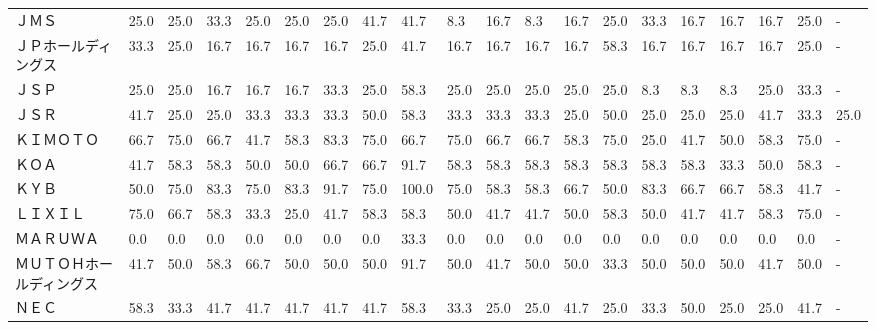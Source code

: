 \documentclass[a4paper，11pt]{jsarticle}
\begin{document}
\begin{longtable}[c]{lp{3mm}p{3mm}p{3mm}p{3mm}p{3mm}p{3mm}p{3mm}p{3mm}p{3mm}p{3mm}p{3mm}p{3mm}p{3mm}p{3mm}p{3mm}p{3mm}p{3mm}p{3mm}p{3mm}}
ＪＭＳ             &   25.0 &   25.0 &      33.3 &      25.0 &       25.0 &   25.0 &   41.7 &   41.7 &     8.3 &    16.7 &    8.3 &  16.7 &   25.0 &    33.3 &    16.7 &  16.7 &  16.7 &  25.0 &     - \\
ＪＰホールディングス      &   33.3 &   25.0 &      16.7 &      16.7 &       16.7 &   16.7 &   25.0 &   41.7 &    16.7 &    16.7 &   16.7 &  16.7 &   58.3 &    16.7 &    16.7 &  16.7 &  16.7 &  25.0 &     - \\
ＪＳＰ             &   25.0 &   25.0 &      16.7 &      16.7 &       16.7 &   33.3 &   25.0 &   58.3 &    25.0 &    25.0 &   25.0 &  25.0 &   25.0 &     8.3 &     8.3 &   8.3 &  25.0 &  33.3 &     - \\
ＪＳＲ             &   41.7 &   25.0 &      25.0 &      33.3 &       33.3 &   33.3 &   50.0 &   58.3 &    33.3 &    33.3 &   33.3 &  25.0 &   50.0 &    25.0 &    25.0 &  25.0 &  41.7 &  33.3 &  25.0 \\
ＫＩＭＯＴＯ          &   66.7 &   75.0 &      66.7 &      41.7 &       58.3 &   83.3 &   75.0 &   66.7 &    75.0 &    66.7 &   66.7 &  58.3 &   75.0 &    25.0 &    41.7 &  50.0 &  58.3 &  75.0 &     - \\
ＫＯＡ             &   41.7 &   58.3 &      58.3 &      50.0 &       50.0 &   66.7 &   66.7 &   91.7 &    58.3 &    58.3 &   58.3 &  58.3 &   58.3 &    58.3 &    58.3 &  33.3 &  50.0 &  58.3 &     - \\
ＫＹＢ             &   50.0 &   75.0 &      83.3 &      75.0 &       83.3 &   91.7 &   75.0 &  100.0 &    75.0 &    58.3 &   58.3 &  66.7 &   50.0 &    83.3 &    66.7 &  66.7 &  58.3 &  41.7 &     - \\
ＬＩＸＩＬ           &   75.0 &   66.7 &      58.3 &      33.3 &       25.0 &   41.7 &   58.3 &   58.3 &    50.0 &    41.7 &   41.7 &  50.0 &   58.3 &    50.0 &    41.7 &  41.7 &  58.3 &  75.0 &     - \\
ＭＡＲＵＷＡ          &    0.0 &    0.0 &       0.0 &       0.0 &        0.0 &    0.0 &    0.0 &   33.3 &     0.0 &     0.0 &    0.0 &   0.0 &    0.0 &     0.0 &     0.0 &   0.0 &   0.0 &   0.0 &     - \\
ＭＵＴＯＨホールディングス   &   41.7 &   50.0 &      58.3 &      66.7 &       50.0 &   50.0 &   50.0 &   91.7 &    50.0 &    41.7 &   50.0 &  50.0 &   33.3 &    50.0 &    50.0 &  50.0 &  41.7 &  50.0 &     - \\
ＮＥＣ             &   58.3 &   33.3 &      41.7 &      41.7 &       41.7 &   41.7 &   41.7 &   58.3 &    33.3 &    25.0 &   25.0 &  41.7 &   25.0 &    33.3 &    50.0 &  25.0 &  25.0 &  41.7 &     - \\

\end{longtable}
\end{document}
